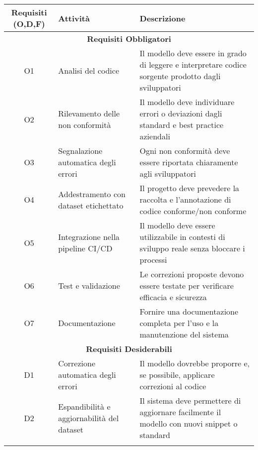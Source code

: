 \begin{tabularx}{\textwidth}{|c|X|X|}
    \hline
    \textbf{Requisiti (O,D,F)} & \textbf{Attività} & \textbf{Descrizione} \\
    \hline
    
    \multicolumn{3}{|c|}{\textbf{Requisiti Obbligatori}} \\
    \hline

    O1 & Analisi del codice & Il modello deve essere in grado di leggere e interpretare codice sorgente prodotto dagli sviluppatori \\
    \hdashline

    O2 & Rilevamento delle non conformità & Il modello deve individuare errori o deviazioni dagli standard e best practice aziendali \\
    \hdashline

    O3 & Segnalazione automatica degli errori & Ogni non conformità deve essere riportata chiaramente agli sviluppatori \\
    \hdashline

    O4 & Addestramento con dataset etichettato & Il progetto deve prevedere la raccolta e l’annotazione di codice conforme/non conforme \\
    \hdashline

    O5 & Integrazione nella pipeline CI/CD & Il modello deve essere utilizzabile in contesti di sviluppo reale senza bloccare i processi \\
    \hdashline

    O6 & Test e validazione & Le correzioni proposte devono essere testate per verificare efficacia e sicurezza \\
    \hdashline

    O7 & Documentazione & Fornire una documentazione completa per l’uso e la manutenzione del sistema \\
    \hline

    \multicolumn{3}{|c|}{\textbf{Requisiti Desiderabili}} \\
    \hline

    D1 & Correzione automatica degli errori & Il modello dovrebbe proporre e, se possibile, applicare correzioni al codice \\
    \hdashline

    D2 & Espandibilità e aggiornabilità del dataset & Il sistema deve permettere di aggiornare facilmente il modello con nuovi snippet o standard \\
    \hdashline


\end{tabularx}
